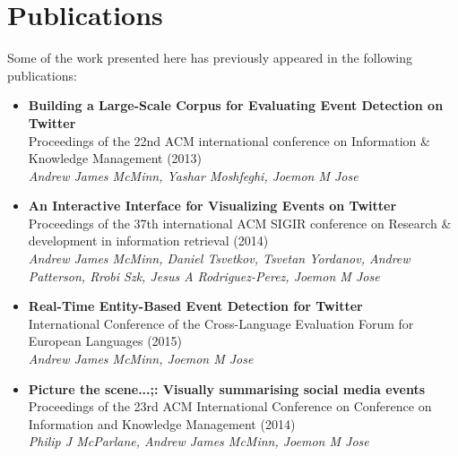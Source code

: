 
\chapter*{Publications}
Some of the work presented here  has previously appeared in the following publications:

\bigskip

\begin{itemize}
	\item{
		\textbf{Building a Large-Scale Corpus for Evaluating Event Detection on Twitter}\\
		Proceedings of the 22nd ACM international conference on Information \& Knowledge Management (2013)\\
		\textit{Andrew James McMinn, Yashar Moshfeghi, Joemon M Jose}
	}

	\vspace{0.75cm}

	\item{
		\textbf{An Interactive Interface for Visualizing Events on Twitter}\\
		Proceedings of the 37th international ACM SIGIR conference on Research \& development in information retrieval (2014)\\
		\textit{Andrew James McMinn, Daniel Tsvetkov, Tsvetan Yordanov, Andrew Patterson, Rrobi Szk, Jesus A Rodriguez-Perez, Joemon M Jose}
	}

	\vspace{0.75cm}

	\item{
		\textbf{Real-Time Entity-Based Event Detection for Twitter}\\
		International Conference of the Cross-Language Evaluation Forum for European Languages (2015)\\
		\textit{Andrew James McMinn, Joemon M Jose}
	}

	\vspace{0.75cm}

	\item{
		\textbf{Picture the scene...;: Visually summarising social media events}\\
		Proceedings of the 23rd ACM International Conference on Conference on Information and Knowledge Management (2014)\\
		\textit{Philip J McParlane, Andrew James McMinn, Joemon M Jose}
	}
\end{itemize}
